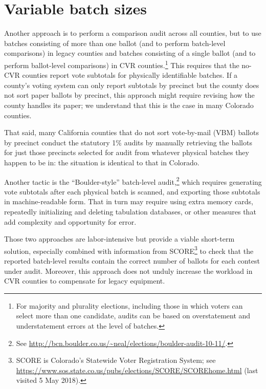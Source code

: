 \documentclass[runningheads]{llncs}
\begin{document}
\section{Variable batch sizes} \label{sec:variable}

Another approach is to perform a comparison audit across all counties, but to use batches consisting
of more than one ballot (and to perform batch-level comparisons)
in legacy counties and batches consisting of a single ballot (and to perform ballot-level comparisons) in CVR counties.\footnote{%
 For majority and plurality elections, including those in which voters can select more than one candidate,
  audits can be based on overstatement and understatement errors at the level of batches.
}
This requires that the no-CVR counties report vote subtotals
for physically identifiable batches.
If a county's voting system can only report subtotals by precinct but 
the county does not sort paper ballots by
precinct, this approach might require revising how the county handles its
paper; we understand that this is the case in many Colorado counties.

That said, many California counties that do not sort vote-by-mail (VBM)
ballots by precinct conduct the statutory 1\% audits by manually retrieving the ballots 
for just those precincts selected for audit from whatever physical batches they happen to be in: 
the situation is identical to that in Colorado.

Another tactic is the ``Boulder-style'' batch-level audit,\footnote{%
 See \url{http://bcn.boulder.co.us/~neal/elections/boulder-audit-10-11/}.
}
which requires generating 
vote subtotals after each physical batch is scanned, and exporting those subtotals in machine-readable form.
That in turn may require using extra memory cards, repeatedly initializing and deleting tabulation databases,
or other measures that add complexity and opportunity for error.

Those two approaches are labor-intensive but provide a viable short-term solution,
especially combined with information from SCORE\footnote{%
 SCORE is Colorado's Statewide Voter Registration System; see
 \url{https://www.sos.state.co.us/pubs/elections/SCORE/SCOREhome.html} (last visited 5 May 2018).
}
to check that the reported batch-level results contain the correct number of ballots for each contest under audit.
Moreover, this approach does not unduly increase the workload in CVR counties
to compensate for legacy equipment.
\end{document}
